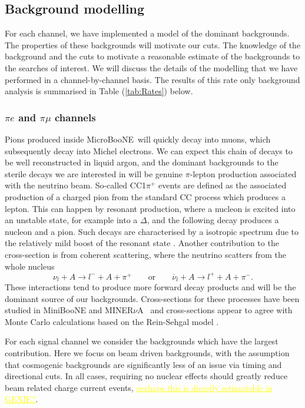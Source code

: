 \documentclass[11pt, a4paper]{article}
\def\muboone{MicroBooNE}
\def\minerva{MINER$\nu$A}
\newcommand{\newtext}[2]{\textcolor{#1}{\ul{#2}}}
\begin{document}
\subsection{Background modelling}
For each channel, we have implemented a model of the dominant backgrounds. The
properties of these backgrounds will motivate our cuts. The knowledge of the
background and the cuts to motivate a reasonable estimate of the backgrounds to the searches of interest.  We will discuss the details of the modelling that we have performed in a channel-by-channel basis. The results of this rate only background analysis is summarised in Table (\ref{tab:Rates}) below.

\subsubsection{$\pi e$ and $\pi \mu$ channels}

Pions produced inside \muboone\ will quickly decay into muons, which
subsequently decay into Michel electrons. We can expect this chain of decays to
be well reconstructed in liquid argon, and the dominant backgrounds to the
sterile decays we are interested in will be genuine $\pi$-lepton production
associated with the neutrino beam. So-called CC1$\pi^+$ events are defined as
the associated production of a charged pion from the standard CC process which
produces a lepton. This can happen by resonant production, where a nucleon is
excited into an unstable state, for example into a $\Delta$, and the following
decay produces a nucleon and a pion. Such decays are characterised by a
isotropic spectrum due to the relatively mild boost of the resonant state
\cite{Rein:1982pf}. Another contribution to the cross-section is from coherent
scattering, where the neutrino scatters from the whole nucleus 
%
\[   \nu_l + A \to l^- + A + \pi^+ \qquad\text{or}\qquad \overline{\nu}_l + A
\to l^+ + A + \pi^-. \]
%
These interactions tend to produce more forward decay products and will be the
dominant source of our backgrounds. Cross-sections for these processes have
been studied in MiniBooNE \cite{Wascko:2006tx} and \minerva\ \cite{Eberly:2014mra} and cross-sections appear to agree with Monte Carlo
calculations based on the Rein-Sehgal model \cite{Rein:2006di, Rein:1982pf}. 

For each signal channel we consider the backgrounds which have the largest contribution. Here we focus on beam driven backgrounds, with the assumption that cosmogenic backgrounds are significantly less of an issue via timing and directional cuts. In all cases, requiring no nuclear effects should greatly reduce beam related charge current events, \newtext{MARK}{perhaps this is directly estimatable in GENIE?}.
\end{document}
